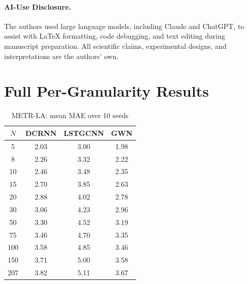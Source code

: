 \documentclass[sigconf]{acmart}
\begin{document}
\paragraph{AI-Use Disclosure.}
The authors used large language models, including Claude and ChatGPT, to assist with LaTeX formatting, code debugging, and text editing during manuscript preparation. All scientific claims, experimental designs, and interpretations are the authors' own.




\appendix

\section{Full Per-Granularity Results}
\label{app:full_results}

\begin{table}[h]
\small
\centering
\caption{METR-LA: mean MAE over 10 seeds}
\label{tab:metr_full}
\begin{tabular}{cccc}
\toprule
$N$ & DCRNN & LSTGCNN & GWN \\
\midrule
5   & 2.03 & 3.00 & 1.98 \\
8   & 2.26 & 3.32 & 2.22 \\
10  & 2.46 & 3.48 & 2.35 \\
15  & 2.70 & 3.85 & 2.63 \\
20  & 2.88 & 4.02 & 2.78 \\
30  & 3.06 & 4.23 & 2.96 \\
50  & 3.30 & 4.52 & 3.19 \\
75  & 3.46 & 4.70 & 3.35 \\
100 & 3.58 & 4.85 & 3.46 \\
150 & 3.71 & 5.00 & 3.58 \\
207 & 3.82 & 5.11 & 3.67 \\
\bottomrule
\end{tabular}
\end{table}
\end{document}
